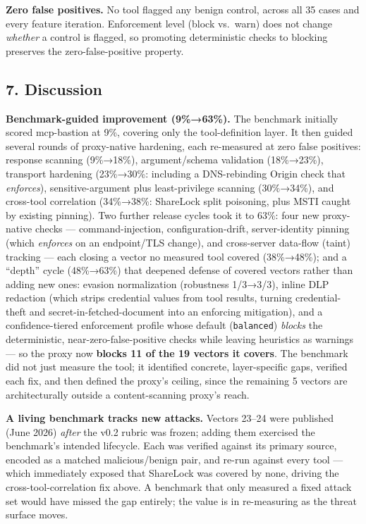 \documentclass[
]{article}
\newcounter{none} %
\begin{document}
\textbf{Zero false positives.} No tool flagged any benign control,
across all 35 cases and every feature iteration. Enforcement level
(block vs.~warn) does not change \emph{whether} a control is flagged, so
promoting deterministic checks to blocking preserves the
zero-false-positive property.

\subsection{7. Discussion}\label{discussion}

\textbf{Benchmark-guided improvement (9\%→63\%).} The benchmark
initially scored mcp-bastion at 9\%, covering only the tool-definition
layer. It then guided several rounds of proxy-native hardening, each
re-measured at zero false positives: response scanning (9\%→18\%),
argument/schema validation (18\%→23\%), transport hardening (23\%→30\%:
including a DNS-rebinding Origin check that \emph{enforces}),
sensitive-argument plus least-privilege scanning (30\%→34\%), and
cross-tool correlation (34\%→38\%: ShareLock split poisoning, plus MSTI
caught by existing pinning). Two further release cycles took it to 63\%:
four new proxy-native checks --- command-injection, configuration-drift,
server-identity pinning (which \emph{enforces} on an endpoint/TLS
change), and cross-server data-flow (taint) tracking --- each closing a
vector no measured tool covered (38\%→48\%); and a ``depth'' cycle
(48\%→63\%) that deepened defense of covered vectors rather than adding
new ones: evasion normalization (robustness 1/3→3/3), inline DLP
redaction (which strips credential values from tool results, turning
credential-theft and secret-in-fetched-document into an enforcing
mitigation), and a confidence-tiered enforcement profile whose default
(\texttt{balanced}) \emph{blocks} the deterministic,
near-zero-false-positive checks while leaving heuristics as warnings ---
so the proxy now \textbf{blocks 11 of the 19 vectors it covers}. The
benchmark did not just measure the tool; it identified concrete,
layer-specific gaps, verified each fix, and then defined the proxy's
ceiling, since the remaining 5 vectors are architecturally outside a
content-scanning proxy's reach.

\textbf{A living benchmark tracks new attacks.} Vectors 23--24 were
published (June 2026) \emph{after} the v0.2 rubric was frozen; adding
them exercised the benchmark's intended lifecycle. Each was verified
against its primary source, encoded as a matched malicious/benign pair,
and re-run against every tool --- which immediately exposed that
ShareLock was covered by none, driving the cross-tool-correlation fix
above. A benchmark that only measured a fixed attack set would have
missed the gap entirely; the value is in re-measuring as the threat
surface moves.
\end{document}
